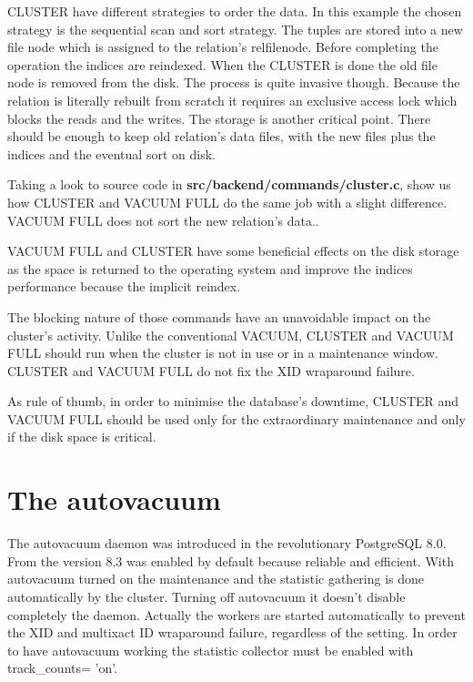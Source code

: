 CLUSTER have different strategies to order the data. In this example the chosen strategy is the sequential
scan and sort strategy. The tuples are stored into a new file node which is assigned to the
relation's relfilenode. Before completing the operation the indices are reindexed. When the CLUSTER is done
the old file node is removed from the disk. The process is quite invasive though. Because the
relation is literally rebuilt from scratch it requires an exclusive access lock which blocks the reads and
the writes. The storage is another critical point. There should be enough to keep old relation's data
files, with the new files plus the indices and the eventual sort on disk.\newline

Taking a look to source code in \textbf{src/backend/commands/cluster.c}, show us how CLUSTER and VACUUM
FULL do the same job with a slight difference. VACUUM FULL does not sort the new relation's data..\newline

VACUUM FULL and CLUSTER have some beneficial effects on the disk storage as the space is returned to the
operating system and improve the indices performance because the implicit reindex.\newline

The blocking nature of those commands have an unavoidable impact on the cluster's activity. Unlike the
conventional VACUUM, CLUSTER and VACUUM FULL should run when the cluster is not in use or in a maintenance
window. CLUSTER and VACUUM FULL do not fix the XID wraparound failure.\newline

As rule of thumb, in order to minimise the database's downtime, CLUSTER and VACUUM FULL should be used only
for the extraordinary maintenance and only if the disk space is critical.



\section{The autovacuum}
\label{sec:AUTOVACUUM}
The autovacuum daemon was introduced in the revolutionary PostgreSQL 8.0. From the version 8.3 was enabled
by default because reliable and efficient. With autovacuum turned on the maintenance and the statistic
gathering is done automatically by the cluster. Turning off autovacuum it doesn't disable completely the
daemon. Actually the workers are started automatically to prevent the XID and multixact ID wraparound
failure, regardless of the setting. In order to have autovacuum working the statistic collector must be
enabled with track\_counts= 'on'.\newline

